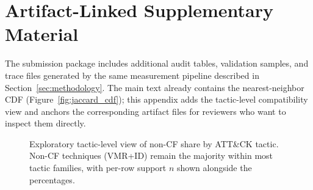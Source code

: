 \documentclass[sigconf]{acmart}
\begin{document}
\section{Artifact-Linked Supplementary Material}\label{sec:appendix_supp}

The submission package includes additional audit tables, validation samples, and trace files generated by the same measurement pipeline described in Section~\ref{sec:methodology}. The main text already contains the nearest-neighbor CDF (Figure~\ref{fig:jaccard_cdf}); this appendix adds the tactic-level compatibility view and anchors the corresponding artifact files for reviewers who want to inspect them directly.

\begin{figure}[!tb]
\centering
\resizebox{\columnwidth}{!}{}
\caption{\label{fig:compatibility_by_tactic}Exploratory tactic-level view of non-CF share by ATT\&CK tactic. Non-CF techniques (VMR+ID) remain the majority within most tactic families, with per-row support $n$ shown alongside the percentages.}
\end{figure}
\end{document}
